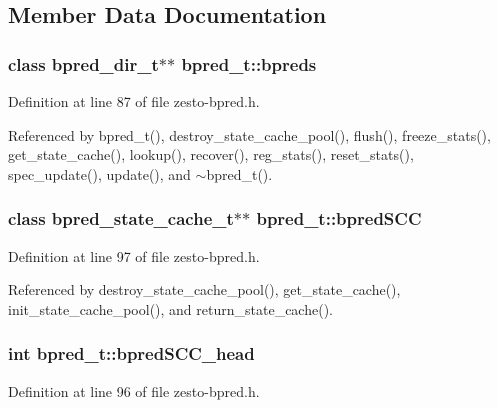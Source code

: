 \subsection{Member Data Documentation}
\subsubsection[{bpreds}]{\setlength{\rightskip}{0pt plus 5cm}class {\bf bpred\_\-dir\_\-t}$\ast$$\ast$ {\bf bpred\_\-t::bpreds}\hspace{0.3cm}{\tt  [protected]}}\label{classbpred__t_7de55e7d3aa1ff1206e1de8eade29bdb}




Definition at line 87 of file zesto-bpred.h.

Referenced by bpred\_\-t(), destroy\_\-state\_\-cache\_\-pool(), flush(), freeze\_\-stats(), get\_\-state\_\-cache(), lookup(), recover(), reg\_\-stats(), reset\_\-stats(), spec\_\-update(), update(), and $\sim$bpred\_\-t().
\subsubsection[{bpredSCC}]{\setlength{\rightskip}{0pt plus 5cm}class {\bf bpred\_\-state\_\-cache\_\-t}$\ast$$\ast$ {\bf bpred\_\-t::bpredSCC}\hspace{0.3cm}{\tt  [protected]}}\label{classbpred__t_4503313bf5a35ddfd7d8ee94f0d60d7c}




Definition at line 97 of file zesto-bpred.h.

Referenced by destroy\_\-state\_\-cache\_\-pool(), get\_\-state\_\-cache(), init\_\-state\_\-cache\_\-pool(), and return\_\-state\_\-cache().
\subsubsection[{bpredSCC\_\-head}]{\setlength{\rightskip}{0pt plus 5cm}int {\bf bpred\_\-t::bpredSCC\_\-head}\hspace{0.3cm}{\tt  [protected]}}\label{classbpred__t_c0a1914924a2fd079f3bdcbace4b48d0}




Definition at line 96 of file zesto-bpred.h.

